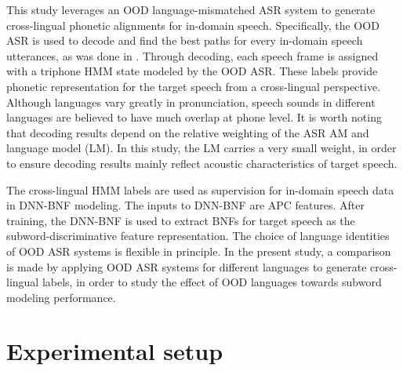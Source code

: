 \documentclass[a4paper]{article}
\begin{document}
This study leverages an OOD language-mismatched ASR system to generate cross-lingual phonetic alignments for in-domain speech.
Specifically, the OOD ASR is used to decode  and find the best paths for every in-domain speech utterances, as was done in \cite{feng2019_TASLP}. Through decoding, each speech frame is assigned with a triphone HMM state modeled by the OOD ASR. These labels provide phonetic representation for the target speech from a cross-lingual perspective. Although languages vary greatly in pronunciation, speech sounds in different languages are believed to have much overlap at phone level.
It is worth noting that decoding results depend on the relative weighting  of the ASR AM and language model (LM). In this study, the LM carries a very small weight, in order to ensure decoding results mainly reflect acoustic characteristics of target speech.

The cross-lingual HMM labels are used as supervision for in-domain speech data in DNN-BNF modeling.
The inputs to DNN-BNF are APC features. 
After training, the DNN-BNF is used to extract BNFs for target speech as the subword-discriminative feature representation. 
The choice of language identities of OOD ASR systems is flexible in principle. In the present study, a comparison is made by applying OOD ASR systems for different languages to generate cross-lingual labels, in order to study the effect  of OOD  languages towards subword modeling performance.


\section{Experimental setup}
\end{document}
